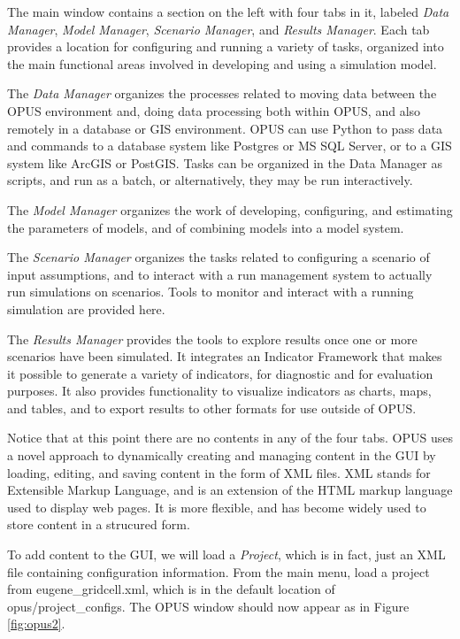 The main window contains a section on the left with four tabs in it, labeled \emph{Data Manager}, \emph{Model Manager}, \emph{Scenario Manager}, and \emph{Results Manager}.  Each tab provides a location for configuring and running a variety of tasks, organized into the main functional areas involved in developing and using a simulation model.  

\squishlist
\item The \emph{Data Manager} organizes the processes related to moving data between the OPUS environment and, doing data processing both within OPUS, and also remotely in a database or GIS environment.  OPUS can use Python to pass data and commands to a database system like Postgres or MS SQL Server, or to a GIS system like ArcGIS or PostGIS.  Tasks can be organized in the Data Manager as scripts, and run as a batch, or alternatively, they may be run interactively.
\item The \emph{Model Manager} organizes the work of developing, configuring, and estimating the parameters of models, and of combining models into a model system.
\item The \emph{Scenario Manager} organizes the tasks related to configuring a scenario of input assumptions, and to interact with a run management system to actually run simulations on scenarios.  Tools to monitor and interact with a running simulation are provided here.
\item The \emph{Results Manager} provides the tools to explore results once one or more scenarios have been simulated.  It integrates an Indicator Framework that makes it possible to generate a variety of indicators, for diagnostic and for evaluation purposes.  It also provides functionality to visualize indicators as charts, maps, and tables, and to export results to other formats for use outside of OPUS.
\squishend

Notice that at this point there are no contents in any of the four tabs.  OPUS uses a novel approach to dynamically creating and managing content in the GUI by loading, editing, and saving content in the form of XML files.  XML stands for Extensible Markup Language, and is an extension of the HTML markup language used to display web pages.  It is more flexible, and has become widely used to store content in a strucured form.  

To add content to the GUI, we will load a \emph{Project}, which is in fact, just an XML file containing configuration information.  From the main menu, load a project from eugene\_gridcell.xml, which is in the default location of opus/project\_configs.  The OPUS window should now appear as in Figure \ref{fig:opus2}.

